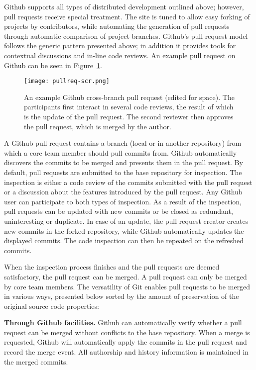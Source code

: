 \documentclass{sig-alternate}
\begin{document}


Github supports all types of distributed development outlined above; however,
pull requests receive special treatment. The site is tuned to allow easy forking
of projects by contributors, while automating the generation of pull requests
through automatic comparison of project branches.
Github's pull request model follows the generic pattern presented above; in
addition it provides tools for contextual discussions and in-line code reviews.
An example pull request on Github can be seen in Figure~\ref{fig:pullreq-scr}.

\begin{figure}[t]
  \centering
   \texttt{[image: pullreq-scr.png]}
   \label{fig:pullreq-scr}

   \caption{An example Github cross-branch pull request (edited for space). The
   participants first interact in several code reviews, the result of which is
   the update of the pull request. The second reviewer then approves the pull
   request, which is merged by the author.}

\end{figure}

A Github pull request contains a branch (local or in another repository) from
which a core team member should pull commits from. Github automatically
discovers the commits to be merged and presents them in the pull request. By
default, pull requests are submitted to the base repository for inspection. The
inspection is either a code review of the commits submitted with the pull
request or a discussion about the features introduced by the pull request. Any
Github user can participate to both types of inspection. As a result of the
inspection, pull requests can be updated with new commits or be closed as
redundant, uninteresting or duplicate. In case of an update, the pull request
creator creates new commits in the forked repository, while Github automatically
updates the displayed commits. The code inspection can then be repeated on the
refreshed commits.

When the inspection process finishes and the pull requests are deemed
satisfactory, the pull request can be merged. A pull request can only be merged
by core team members. The versatility of Git enables pull requests to be
merged in various ways, presented below sorted by the amount of preservation of
the original source code properties:

\textbf{Through Github facilities.}
    Github can automatically verify whether a
    pull request can be merged without conflicts to the base repository. When a
    merge is requested, Github will automatically apply the commits in the pull
    request and record the merge event. All authorship and history information
    is maintained in the merged commits.
\end{document}
